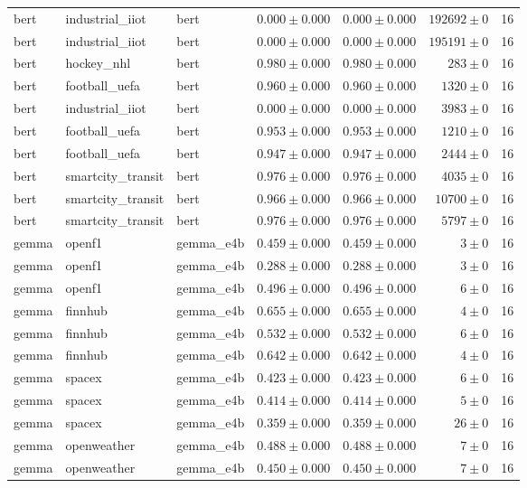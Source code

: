 \begin{table}[htbp]
\begin{tabular}{l l l r r r r}
bert & industrial\_iiot & bert & $0.000\pm0.000$ & $0.000\pm0.000$ & $192692\pm0$ & 16 \\
bert & industrial\_iiot & bert & $0.000\pm0.000$ & $0.000\pm0.000$ & $195191\pm0$ & 16 \\
bert & hockey\_nhl & bert & $0.980\pm0.000$ & $0.980\pm0.000$ & $283\pm0$ & 16 \\
bert & football\_uefa & bert & $0.960\pm0.000$ & $0.960\pm0.000$ & $1320\pm0$ & 16 \\
bert & industrial\_iiot & bert & $0.000\pm0.000$ & $0.000\pm0.000$ & $3983\pm0$ & 16 \\
bert & football\_uefa & bert & $0.953\pm0.000$ & $0.953\pm0.000$ & $1210\pm0$ & 16 \\
bert & football\_uefa & bert & $0.947\pm0.000$ & $0.947\pm0.000$ & $2444\pm0$ & 16 \\
bert & smartcity\_transit & bert & $0.976\pm0.000$ & $0.976\pm0.000$ & $4035\pm0$ & 16 \\
bert & smartcity\_transit & bert & $0.966\pm0.000$ & $0.966\pm0.000$ & $10700\pm0$ & 16 \\
bert & smartcity\_transit & bert & $0.976\pm0.000$ & $0.976\pm0.000$ & $5797\pm0$ & 16 \\
gemma & openf1 & gemma\_e4b & $0.459\pm0.000$ & $0.459\pm0.000$ & $3\pm0$ & 16 \\
gemma & openf1 & gemma\_e4b & $0.288\pm0.000$ & $0.288\pm0.000$ & $3\pm0$ & 16 \\
gemma & openf1 & gemma\_e4b & $0.496\pm0.000$ & $0.496\pm0.000$ & $6\pm0$ & 16 \\
gemma & finnhub & gemma\_e4b & $0.655\pm0.000$ & $0.655\pm0.000$ & $4\pm0$ & 16 \\
gemma & finnhub & gemma\_e4b & $0.532\pm0.000$ & $0.532\pm0.000$ & $6\pm0$ & 16 \\
gemma & finnhub & gemma\_e4b & $0.642\pm0.000$ & $0.642\pm0.000$ & $4\pm0$ & 16 \\
gemma & spacex & gemma\_e4b & $0.423\pm0.000$ & $0.423\pm0.000$ & $6\pm0$ & 16 \\
gemma & spacex & gemma\_e4b & $0.414\pm0.000$ & $0.414\pm0.000$ & $5\pm0$ & 16 \\
gemma & spacex & gemma\_e4b & $0.359\pm0.000$ & $0.359\pm0.000$ & $26\pm0$ & 16 \\
gemma & openweather & gemma\_e4b & $0.488\pm0.000$ & $0.488\pm0.000$ & $7\pm0$ & 16 \\
gemma & openweather & gemma\_e4b & $0.450\pm0.000$ & $0.450\pm0.000$ & $7\pm0$ & 16 \\

\end{tabular}
\end{table}
